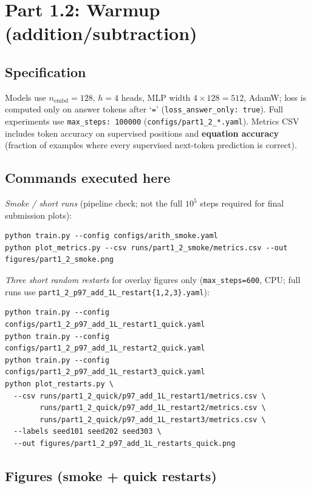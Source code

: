 \documentclass[11pt]{article}
\begin{document}
\section*{Part 1.2: Warmup (addition/subtraction)}

\subsection*{Specification}

Models use $n_{\mathrm{embd}}=128$, $h=4$ heads, MLP width $4\times 128=512$, AdamW; loss is computed only on answer tokens after `\texttt{=}' (\texttt{loss\_answer\_only:\ true}). Full experiments use \texttt{max\_steps:\ 100000} (\texttt{configs/part1\_2\_*.yaml}). Metrics CSV includes token accuracy on supervised positions and \textbf{equation accuracy} (fraction of examples where every supervised next-token prediction is correct).

\subsection*{Commands executed here}

\textit{Smoke / short runs} (pipeline check; not the full $10^5$ steps required for final submission plots):

\begin{verbatim}
python train.py --config configs/arith_smoke.yaml
python plot_metrics.py --csv runs/part1_2_smoke/metrics.csv --out figures/part1_2_smoke.png
\end{verbatim}

\noindent
\textit{Three short random restarts} for overlay figures only (\texttt{max\_steps=600}, CPU; full runs use \texttt{part1\_2\_p97\_add\_1L\_restart\{1,2,3\}.yaml}):

\begin{verbatim}
python train.py --config configs/part1_2_p97_add_1L_restart1_quick.yaml
python train.py --config configs/part1_2_p97_add_1L_restart2_quick.yaml
python train.py --config configs/part1_2_p97_add_1L_restart3_quick.yaml
python plot_restarts.py \
  --csv runs/part1_2_quick/p97_add_1L_restart1/metrics.csv \
        runs/part1_2_quick/p97_add_1L_restart2/metrics.csv \
        runs/part1_2_quick/p97_add_1L_restart3/metrics.csv \
  --labels seed101 seed202 seed303 \
  --out figures/part1_2_p97_add_1L_restarts_quick.png
\end{verbatim}

\subsection*{Figures (smoke + quick restarts)}
\end{document}
